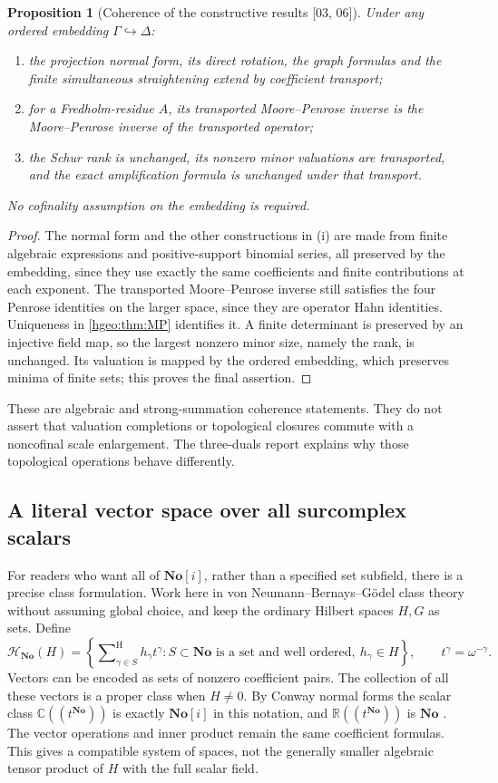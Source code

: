 \documentclass[11pt,letterpaper]{article}
\numberwithin{equation}{section}
\newtheorem{proposition}[proposition]{Proposition}
\theoremstyle{definition}
\theoremstyle{remark}
\newcommand{\R}{\mathbb R}
\newcommand{\C}{\mathbb C}
\newcommand{\No}{\mathbf{No}}
\newcommand{\sH}{\mathop{\sum}\nolimits^{\mathrm H}}
\newcommand{\src}[1]{\textup{\textsf{\small[#1]}}}
\begin{document}
\begin{proposition}[Coherence of the constructive results \src{03, 06}]
\label{hgeo:prop:extension}
Under any ordered embedding $\Gamma\hookrightarrow\Delta$:
\begin{enumerate}[label=\textup{(\roman*)}]
\item the projection normal form, its direct rotation, the graph formulas
and the finite simultaneous straightening extend by coefficient transport;
\item for a Fredholm-residue $A$, its transported Moore--Penrose
inverse is the Moore--Penrose inverse of the transported operator;
\item the Schur rank is unchanged, its nonzero minor valuations are
transported, and the exact amplification formula is unchanged under
that transport.
\end{enumerate}
No cofinality assumption on the embedding is required.
\end{proposition}
\begin{proof}
The normal form and the other constructions in (i) are made from finite
algebraic expressions and positive-support binomial series, all preserved
by the embedding, since they use exactly the same coefficients and finite
contributions at each exponent. The transported Moore--Penrose inverse still
satisfies the four Penrose identities on the larger space, since they are
operator Hahn identities. Uniqueness in \cref{hgeo:thm:MP} identifies it.
A finite determinant is preserved by an injective field map, so the
largest nonzero minor size, namely the rank, is unchanged. Its
valuation is mapped by the ordered embedding, which preserves
minima of finite sets; this proves the final assertion.
\end{proof}

These are algebraic and strong-summation coherence statements. They do not
assert that valuation completions or topological closures commute
with a noncofinal scale enlargement. The three-duals report explains
why those topological operations behave differently.

\subsection{A literal vector space over all surcomplex scalars}
For readers who want all of $\No[i]$, rather than a specified set
subfield, there is a precise class formulation. Work here in
von Neumann--Bernays--G\"odel class theory without assuming global
choice, and keep the ordinary Hilbert spaces $H,G$ as sets. Define
\[
 \mathscr H_{\No}(H)=
 \left\{\sH_{\gamma\in S}h_\gamma t^\gamma:
 S\subset\No\text{ is a set and well ordered},\ h_\gamma\in H\right\},
 \qquad t^\gamma=\omega^{-\gamma}.
\]
Vectors can be encoded as sets of nonzero coefficient pairs. The
collection of all these vectors is a proper class when $H\ne0$.
By Conway normal forms the scalar class
$\C((t^{\No}))$ is exactly $\No[i]$ in this notation, and $\R((t^{\No}))$ is
$\No$ \cite{Conway}. The vector operations and inner product remain the same
coefficient formulas. This gives a compatible system of spaces, not the
generally smaller algebraic tensor product of $H$ with the full scalar field.
\end{document}
